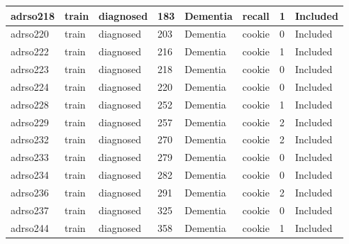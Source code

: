 \begin{center}
\begin{longtable}{|l|l|l|l|l|l|l|l|}
adrso218       & train                 & diagnosed         & 183                & Dementia             & recall          & 1                & Included      \\ \hline
adrso220       & train                 & diagnosed         & 203                & Dementia             & cookie          & 0                & Included      \\ \hline
adrso222       & train                 & diagnosed         & 216                & Dementia             & cookie          & 1                & Included      \\ \hline
adrso223       & train                 & diagnosed         & 218                & Dementia             & cookie          & 0                & Included      \\ \hline
adrso224       & train                 & diagnosed         & 220                & Dementia             & cookie          & 0                & Included      \\ \hline
adrso228       & train                 & diagnosed         & 252                & Dementia             & cookie          & 1                & Included      \\ \hline
adrso229       & train                 & diagnosed         & 257                & Dementia             & cookie          & 2                & Included      \\ \hline
adrso232       & train                 & diagnosed         & 270                & Dementia             & cookie          & 2                & Included      \\ \hline
adrso233       & train                 & diagnosed         & 279                & Dementia             & cookie          & 0                & Included      \\ \hline
adrso234       & train                 & diagnosed         & 282                & Dementia             & cookie          & 0                & Included      \\ \hline
adrso236       & train                 & diagnosed         & 291                & Dementia             & cookie          & 2                & Included      \\ \hline
adrso237       & train                 & diagnosed         & 325                & Dementia             & cookie          & 0                & Included      \\ \hline
adrso244       & train                 & diagnosed         & 358                & Dementia             & cookie          & 1                & Included      \\ \hline

\end{longtable}
\end{center}
